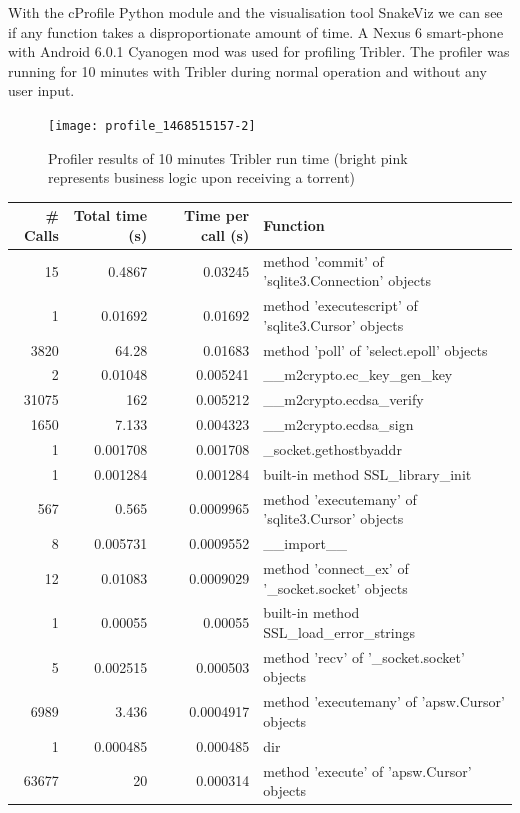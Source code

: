With the cProfile Python module and the visualisation tool SnakeViz we can see if any function takes a disproportionate amount of time.
A Nexus 6 smart-phone with Android 6.0.1 Cyanogen mod was used for profiling Tribler.
The profiler was running for 10 minutes with Tribler during normal operation and without any user input.
\begin{figure}[h]
	\centering
	\texttt{[image: profile\_1468515157-2]}
	\caption{Profiler results of 10 minutes Tribler run time (bright pink represents business logic upon receiving a torrent)}
	\label{fig:profile}
\end{figure}
\begin{table}
	\begin{tabular}{*{3}{r} | l} \hline
		\# Calls & Total time (s) & Time per call (s) & Function \\ \hline \hline
		15 & 0.4867 & 0.03245 & method 'commit' of 'sqlite3.Connection' objects \\ \hline
		1 & 0.01692 & 0.01692 & method 'executescript' of 'sqlite3.Cursor' objects \\ \hline
		3820 & 64.28 & 0.01683 & method 'poll' of 'select.epoll' objects \\ \hline
		2 & 0.01048 & 0.005241 & \_\_m2crypto.ec\_key\_gen\_key \\ \hline
		31075 & 162 & 0.005212 & \_\_m2crypto.ecdsa\_verify \\ \hline
		1650 & 7.133 & 0.004323 & \_\_m2crypto.ecdsa\_sign \\ \hline
		1 & 0.001708 & 0.001708 & \_socket.gethostbyaddr \\ \hline
		1 & 0.001284 & 0.001284 & built-in method SSL\_library\_init \\ \hline
		567 & 0.565 & 0.0009965 & method 'executemany' of 'sqlite3.Cursor' objects \\ \hline
		8 & 0.005731 & 0.0009552 & \_\_import\_\_ \\ \hline
		12 & 0.01083 & 0.0009029 & method 'connect\_ex' of '\_socket.socket' objects \\ \hline
		1 & 0.00055 & 0.00055 & built-in method SSL\_load\_error\_strings \\ \hline
		5 & 0.002515 & 0.000503 & method 'recv' of '\_socket.socket' objects \\ \hline
		6989 & 3.436 & 0.0004917 & method 'executemany' of 'apsw.Cursor' objects \\ \hline
		1 & 0.000485 & 0.000485 & dir \\ \hline
		63677 & 20 & 0.000314 & method 'execute' of 'apsw.Cursor' objects \\ \hline

\end{tabular}
\end{table}

